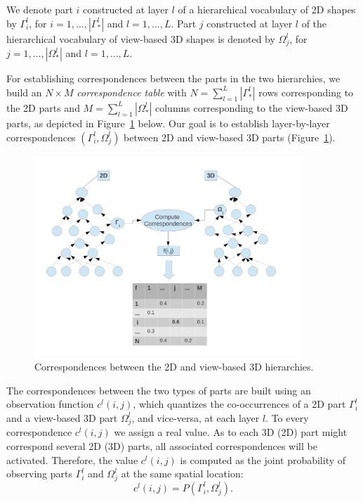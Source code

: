 \documentclass[runningheads]{llncs}
\begin{document}
We denote part $i$ constructed at layer $l$ of a  hierarchical vocabulary of 2D shapes by $\Gamma_{i}^{l}$, for $i=1,\ldots,|\Gamma_*^l|$ and $l=1,\ldots,L$. Part $j$ constructed at layer $l$ of the  hierarchical vocabulary of view-based 3D shapes is denoted by $\Omega_{j}^{l}$, for $j=1,\ldots,|\Omega_*^l|$ and $l=1,\ldots,L$.

For establishing correspondences between the parts in the two hierarchies, we build an $N\times M$ \emph{correspondence table} with $N=\sum_{l=1}^L |\Gamma_*^l|$ rows corresponding to the 2D parts and $M=\sum_{l=1}^L |\Omega_*^l|$ columns corresponding to the view-based 3D parts, as depicted in Figure~\ref{fig:fused-models} below.  Our goal is to establish layer-by-layer correspondences $(\Gamma_{i}^l,\Omega_{j}^l)$ between 2D and view-based 3D  parts (Figure~\ref{fig:fused-models}).

\begin{figure}
\begin{center}
\includegraphics[width=0.9\textwidth]{Fused_representation}
\end{center}
\caption{Correspondences between the 2D and view-based 3D hierarchies.}
\label{fig:fused-models}
\end{figure}

The correspondences between the two types of parts are built using an observation function $c^l(i,j)$, which quantizes the co-occurrences of a 2D part $\Gamma_i^l$ and a view-based 3D part $\Omega_j^l$, and vice-versa, at each layer $l$. 
To every correspondence $c^l(i,j)$ we assign a real value. As to each 3D (2D) part might correspond several 2D (3D) parts, all associated correspondences will be activated. Therefore, the value $c^l(i,j)$ is computed as the joint probability of observing parts $\Gamma_i^l$ and $\Omega_j^l$ at the same spatial location:
\begin{equation}
  c^l(i,j) = P(\Gamma_i^l,\Omega_j^l).
  \label{eqn:cij.Pij}
 \end{equation} 
\end{document}

